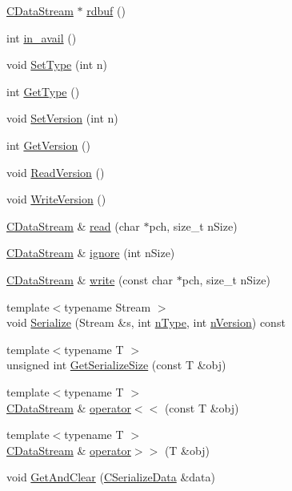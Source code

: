 \begin{DoxyCompactItemize}
\item 
\hyperlink{class_c_data_stream}{C\+Data\+Stream} $\ast$ \hyperlink{class_c_data_stream_a45a08b8355d47a95e9dae87ed6487483}{rdbuf} ()
\item 
int \hyperlink{class_c_data_stream_a0483fe7bccf16aa88bf7272f18a0a7b0}{in\+\_\+avail} ()
\item 
void \hyperlink{class_c_data_stream_a92467b36f5b2edff8becb5eadec633ce}{Set\+Type} (int n)
\item 
int \hyperlink{class_c_data_stream_a14bc0652cfd49850a032f0a1651456a7}{Get\+Type} ()
\item 
void \hyperlink{class_c_data_stream_a267d1315f3f9e9bcf9e7168beaa240c4}{Set\+Version} (int n)
\item 
int \hyperlink{class_c_data_stream_acb7af65ccac8273fc694a25796814ddc}{Get\+Version} ()
\item 
void \hyperlink{class_c_data_stream_ad8f97bbd83ef3d2eebfd3f9c82f55260}{Read\+Version} ()
\item 
void \hyperlink{class_c_data_stream_a35d49028155fb47d2bb5c2dbaf31bc8e}{Write\+Version} ()
\item 
\hyperlink{class_c_data_stream}{C\+Data\+Stream} \& \hyperlink{class_c_data_stream_af3743932a68e3ee3f1dbd357993a51ae}{read} (char $\ast$pch, size\+\_\+t n\+Size)
\item 
\hyperlink{class_c_data_stream}{C\+Data\+Stream} \& \hyperlink{class_c_data_stream_aebfcaa009d328a208dbbcd13db846dd6}{ignore} (int n\+Size)
\item 
\hyperlink{class_c_data_stream}{C\+Data\+Stream} \& \hyperlink{class_c_data_stream_abcab3fa1be7676ffdb34908ec7c84b78}{write} (const char $\ast$pch, size\+\_\+t n\+Size)
\item 
{\footnotesize template$<$typename Stream $>$ }\\void \hyperlink{class_c_data_stream_a3ecece05df6fb20d5f7b93e59acb8ff3}{Serialize} (Stream \&s, int \hyperlink{class_c_data_stream_a2b646679e24cf6f382fe8ab2d4f50f35}{n\+Type}, int \hyperlink{class_c_data_stream_a074998c6b7c8aa17a1a90dbc414b605d}{n\+Version}) const 
\item 
{\footnotesize template$<$typename T $>$ }\\unsigned int \hyperlink{class_c_data_stream_aaf2b9e953793ce5a4fc438a7ecb00dc2}{Get\+Serialize\+Size} (const T \&obj)
\item 
{\footnotesize template$<$typename T $>$ }\\\hyperlink{class_c_data_stream}{C\+Data\+Stream} \& \hyperlink{class_c_data_stream_af47c6d4051064a226f529ee4d7c13ad7}{operator$<$$<$} (const T \&obj)
\item 
{\footnotesize template$<$typename T $>$ }\\\hyperlink{class_c_data_stream}{C\+Data\+Stream} \& \hyperlink{class_c_data_stream_ac80cfc65569416f8c23e328edb4cadae}{operator$>$$>$} (T \&obj)
\item 
void \hyperlink{class_c_data_stream_a4be60514b69c71a722e16bf1fbbc3c6c}{Get\+And\+Clear} (\hyperlink{serialize_8h_a77935f92ff5ba1d71d692166f6ce0c1b}{C\+Serialize\+Data} \&data)
\end{DoxyCompactItemize}
